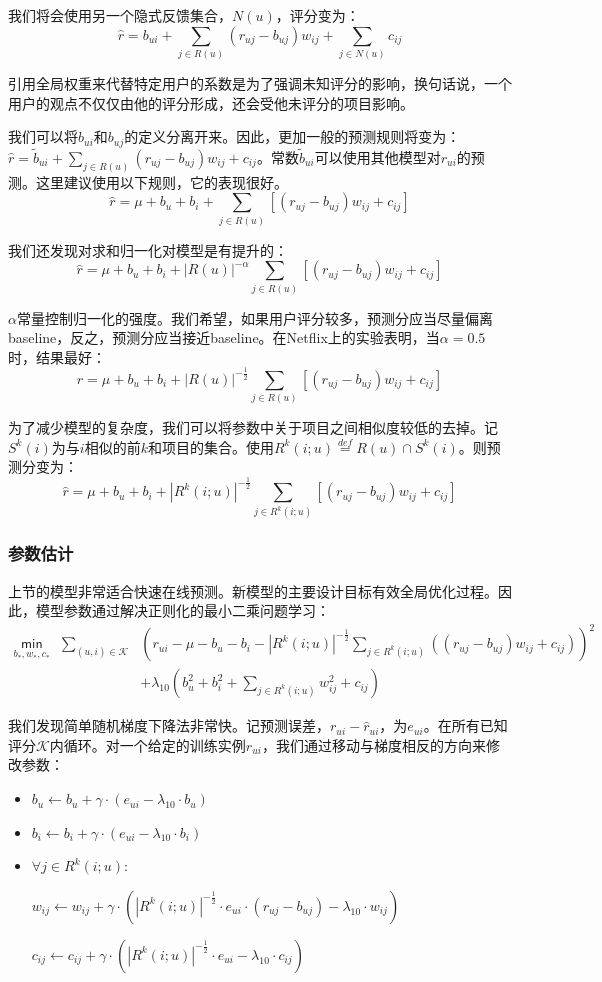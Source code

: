 \documentclass{article}
\begin{document}
我们将会使用另一个隐式反馈集合，$N(u)$，评分变为：
$$ \hat{r}=b_{ui}+\mathop{\sum}\limits_{j\in R(u)}(r_{uj}-b_{uj})w_{ij}+\mathop{\sum}\limits_{j\in N(u)}c_{ij} $$

引用全局权重来代替特定用户的系数是为了强调未知评分的影响，换句话说，一个用户的观点不仅仅由他的评分形成，还会受他未评分的项目影响。

我们可以将$b_{ui}$和$b_{uj}$的定义分离开来。因此，更加一般的预测规则将变为：$\hat{r}=\tilde{b}_{ui}+\mathop{\sum}_{j\in R(u)}(r_{uj}-b_{uj})w_{ij}+c_{ij}$。常数$\tilde{b}_{ui}$可以使用其他模型对$r_{ui}$的预测。这里建议使用以下规则，它的表现很好。
$$ \hat{r}=\mu+b_u+b_i+\mathop{\sum}\limits_{j\in R(u)}[(r_{uj}-b_{uj})w_{ij}+c_{ij}] $$

我们还发现对求和归一化对模型是有提升的：
$$ \hat{r}=\mu+b_u+b_i+|R(u)|^{-\alpha}\mathop{\sum}\limits_{j\in R(u)}[(r_{uj}-b_{uj})w_{ij}+c_{ij}] $$

$\alpha$常量控制归一化的强度。我们希望，如果用户评分较多，预测分应当尽量偏离baseline，反之，预测分应当接近baseline。在Netflix上的实验表明，当$\alpha=0.5$时，结果最好：
$$ \hat{r}=\mu+b_u+b_i+|R(u)|^{-\frac{1}{2}}\mathop{\sum}\limits_{j\in R(u)}[(r_{uj}-b_{uj})w_{ij}+c_{ij}] $$

为了减少模型的复杂度，我们可以将参数中关于项目之间相似度较低的去掉。记$S^k(i)$为与$i$相似的前$k$和项目的集合。使用$R^k(i;u)\mathop{=}\limits^{def}R(u)\cap S^k(i)$。则预测分变为：
$$ \hat{r}=\mu+b_u+b_i+|R^k(i;u)|^{-\frac{1}{2}}\mathop{\sum}\limits_{j\in R^k(i;u)}[(r_{uj}-b_{uj})w_{ij}+c_{ij}] $$

\subsubsection{参数估计}
上节的模型非常适合快速在线预测。新模型的主要设计目标有效全局优化过程。因此，模型参数通过解决正则化的最小二乘问题学习：
\[ 
\begin{array}{ccl}
\mathop{\mathsf{min}}\limits_{b_*,w_*,c_*} & \mathop{\sum}\limits_{(u,i)\in\mathcal{K}} & \left(r_{ui}-\mu-b_u-b_i-|R^k(i;u)|^{-\frac{1}{2}}\mathop{\sum}\limits_{j\in R^k(i;u)}((r_{uj}-b_{uj})w_{ij}+c_{ij})\right)^2\\
& & +\lambda_{10}\left(b_u^2+b_i^2+\mathop{\sum}\limits_{j\in R^k(i;u)}w_{ij}^2+c_{ij}\right) 
\end{array}
\]

我们发现简单随机梯度下降法非常快。记预测误差，$r_{ui}-\hat{r}_{ui}$，为$e_{ui}$。在所有已知评分$\mathcal{K}$内循环。对一个给定的训练实例$r_{ui}$，我们通过移动与梯度相反的方向来修改参数：
\begin{itemize}
\item $b_u\leftarrow b_u+\gamma\cdot(e_{ui}-\lambda_{10}\cdot b_u)$
\item $b_i\leftarrow b_i+\gamma\cdot(e_{ui}-\lambda_{10}\cdot b_i)$
\item $\forall j\in R^k(i;u):$

$w_{ij}\leftarrow w_{ij}+\gamma\cdot\left(|R^k(i;u)|^{-\frac{1}{2}}\cdot e_{ui}\cdot(r_{uj}-b_{uj})-\lambda_{10}\cdot w_{ij}\right)$

$c_{ij}\leftarrow c_{ij}+\gamma\cdot\left(|R^k(i;u)|^{-\frac{1}{2}}\cdot e_{ui}-\lambda_{10}\cdot c_{ij}\right)$
\end{itemize}
\end{document}
